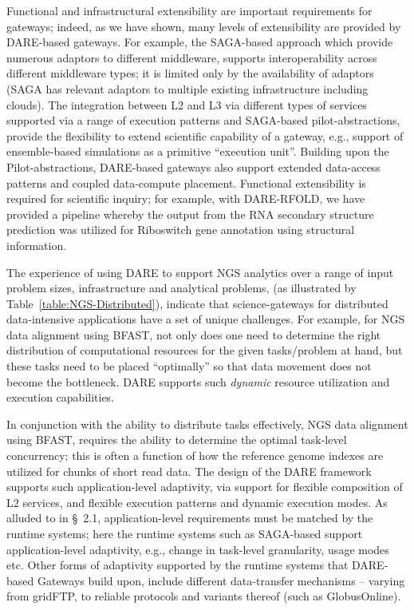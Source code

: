 \documentclass[]{svjour3}
\begin{document}
Functional and infrastructural extensibility are important
requirements for gateways; indeed, as we have shown, many levels of
extensibility are provided by DARE-based gateways. For example, the
SAGA-based approach which provide numerous adaptors to different
middleware, supports interoperability across different middleware
types; it is limited only by the availability of adaptors (SAGA has
relevant adaptors to multiple existing infrastructure including
clouds). The integration between L2 and L3 via different types of
services supported via a range of execution patterns and SAGA-based
pilot-abstractions, provide the flexibility to extend scientific
capability of a gateway, e.g., support of ensemble-based simulations
as a primitive ``execution unit''. Building upon the
Pilot-abstractions, DARE-based gateways also support extended
data-access patterns and coupled data-compute placement. Functional
extensibility is required for scientific inquiry; for example, with
DARE-RFOLD, we have provided a pipeline whereby the output from the
RNA secondary structure prediction was utilized for Riboswitch gene
annotation using structural information.

The experience of using DARE to support NGS analytics over a range of
input problem sizes, infrastructure and analytical problems, (as
illustrated by Table~\ref{table:NGS-Distributed}), indicate that
science-gateways for distributed data-intensive applications have a
set of unique challenges. For example, for NGS data alignment using
BFAST, not only does one need to determine the right distribution of
computational resources for the given tasks/problem at hand, but these
tasks need to be placed ``optimally'' so that data movement does not
become the bottleneck. DARE supports such {\it dynamic} resource
utilization and execution capabilities.


In conjunction with the ability to distribute tasks effectively, NGS
data alignment using BFAST, requires the ability to determine the
optimal task-level concurrency; this is often a function of how the
reference genome indexes are utilized for chunks of short read
data\cite{dare-ecmls11}. The design of the DARE framework supports
such application-level adaptivity, via support for flexible
composition of L2 services, and flexible execution patterns and
dynamic execution modes. As alluded to in \S~2.1, application-level
requirements must be matched by the runtime systems; here the runtime
systems such as SAGA-based \pilotjobs support application-level
adaptivity, e.g., change in task-level granularity, usage modes etc.
Other forms of adaptivity supported by the runtime systems that
DARE-based Gateways build upon, include different data-transfer
mechanisms -- varying from gridFTP, to reliable protocols and variants
thereof (such as GlobusOnline).
\end{document}
